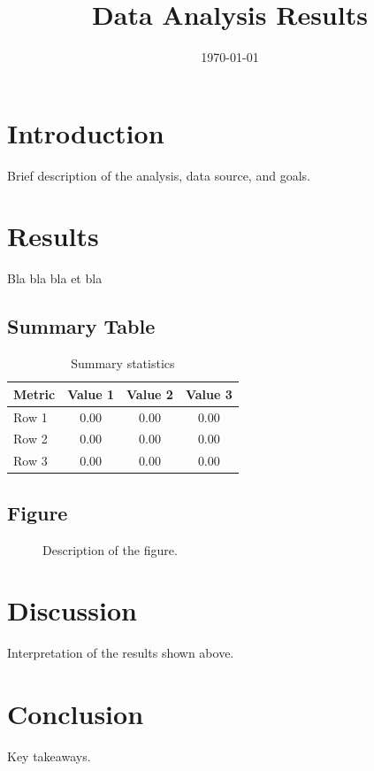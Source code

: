 \documentclass[11pt]{article}
\title{Data Analysis Results}
\author{}
\date{\today}
\begin{document}
\maketitle

\section{Introduction}

Brief description of the analysis, data source, and goals.

\section{Results}

Bla bla bla et bla
\subsection{Summary Table}

\begin{table}[H]
    \centering
    \caption{Summary statistics}
    \label{tab:summary}
    \begin{tabular}{lccc}
        \toprule
        Metric & Value 1 & Value 2 & Value 3 \\
        \midrule
        Row 1  & 0.00    & 0.00    & 0.00    \\
        Row 2  & 0.00    & 0.00    & 0.00    \\
        Row 3  & 0.00    & 0.00    & 0.00    \\
        \bottomrule
    \end{tabular}
\end{table}

\subsection{Figure}

\begin{figure}[H]
    \centering
    \caption{Description of the figure.}
    \label{fig:figure1}
\end{figure}

\section{Discussion}

Interpretation of the results shown above.

\section{Conclusion}

Key takeaways.
\end{document}
